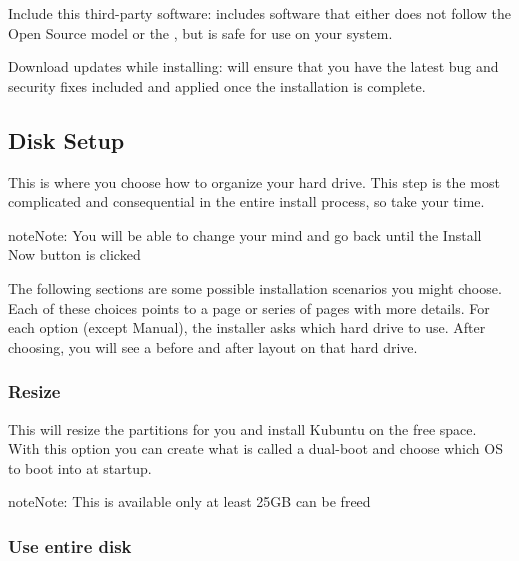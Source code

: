 \documentclass[letterpaper,10pt,english]{sphinxmanual}
\begin{document}

Include this third-party software: includes software that either does not follow the Open Source model or the , but is safe for use on your system.

Download updates while installing: will ensure that you have the latest bug and security fixes included and applied once the installation is complete.


\subsection{Disk Setup}
\label{\detokenize{docs/installation:disk-setup}}
This is where you choose how to organize your hard drive. This step is the most complicated and consequential in the entire install process, so take your time.

\begin{sphinxadmonition}{note}{Note:}
You will be able to change your mind and go back until the Install Now button is clicked
\end{sphinxadmonition}

The following sections are some possible installation scenarios you might choose. Each of these choices points to a page or series of pages with more details. For each option (except Manual), the installer asks which hard drive to use. After choosing, you will see a before and after layout on that hard drive.


\subsubsection{Resize}
\label{\detokenize{docs/installation:resize}}
This will resize the partitions for you and install Kubuntu on the free space. With this option you can create what is called a dual-boot and choose which OS to boot into at startup.

\begin{sphinxadmonition}{note}{Note:}
This is available only at least 25GB can be freed
\end{sphinxadmonition}


\subsubsection{Use entire disk}
\label{\detokenize{docs/installation:use-entire-disk}}
\end{document}
